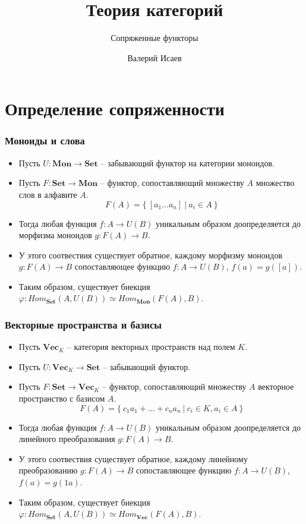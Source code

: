 \documentclass{beamer}
\theoremstyle{definition}
\newcommand{\cat}[1]{\mathbf{#1}}
\newcommand{\Set}{\cat{Set}}
\newcommand{\Mon}{\cat{Mon}}
\renewcommand{\Vec}{\cat{Vec}}
\begin{document}
\title{Теория категорий}
\subtitle{Сопряженные функторы}
\author{Валерий Исаев}
\maketitle

\section{Определение сопряженности}

\begin{frame}
\frametitle{Моноиды и слова}
\begin{itemize}
\item Пусть $U : \Mon \to \Set$ -- забывающий функтор на категории моноидов.
\item Пусть $F : \Set \to \Mon$ -- функтор, сопоставляющий множеству $A$ множество слов в алфавите $A$.
\[ F(A) = \{\ [a_1 \ldots a_n]\ |\ a_i \in A \ \} \]
\item Тогда любая функция $f : A \to U(B)$ уникальным образом доопределяется до морфизма моноидов $g : F(A) \to B$.
\item У этого соотвествия существует обратное, каждому морфизму моноидов $g : F(A) \to B$ сопоставляющее функцию $f : A \to U(B)$, $f(a) = g([a])$.
\item Таким образом, существует биекция $\varphi : Hom_\Set(A, U(B)) \simeq Hom_\Mon(F(A), B)$.
\end{itemize}
\end{frame}

\begin{frame}
\frametitle{Векторные пространства и базисы}
\begin{itemize}
\item Пусть $\Vec_K$ -- категория векторных пространств над полем $K$.
\item Пусть $U : \Vec_K \to \Set$ -- забывающий функтор.
\item Пусть $F : \Set \to \Vec_K$ -- функтор, сопоставляющий множеству $A$ векторное пространство с базисом $A$.
\[ F(A) = \{\ c_1 a_1 + \ldots + c_n a_n\ |\ c_i \in K, a_i \in A \ \} \]
\item Тогда любая функция $f : A \to U(B)$ уникальным образом доопределяется до линейного преобразования $g : F(A) \to B$.
\item У этого соотвествия существует обратное, каждому линейному преобразованию $g : F(A) \to B$ сопоставляющее функцию $f : A \to U(B)$, $f(a) = g(1 a)$.
\item Таким образом, существует биекция $\varphi : Hom_\Set(A, U(B)) \simeq Hom_\Vec(F(A), B)$.
\end{itemize}
\end{frame}
\end{document}
